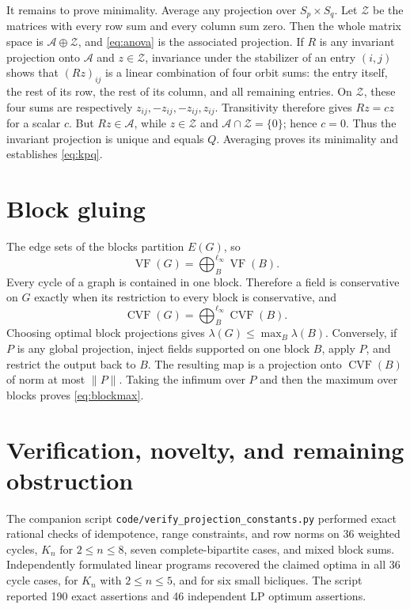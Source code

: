 \documentclass[11pt]{article}
\newcommand{\VF}{\operatorname{VF}}
\newcommand{\CVF}{\operatorname{CVF}}
\begin{document}
It remains to prove minimality.  Average any projection over
\(S_p\times S_q\).  Let
\(\mathcal Z\) be the matrices with every row sum and every column sum
zero.  Then the whole matrix space is \(\mathcal A\oplus\mathcal Z\), and
\eqref{eq:anova} is the associated projection.  If \(R\) is any invariant
projection onto \(\mathcal A\) and \(z\in\mathcal Z\), invariance under
the stabilizer of an entry \((i,j)\) shows that \((Rz)_{ij}\) is a linear
combination of four orbit sums: the entry itself, the rest of its row, the
rest of its column, and all remaining entries.  On \(\mathcal Z\), these
four sums are respectively \(z_{ij},-z_{ij},-z_{ij},z_{ij}\).  Transitivity
therefore gives \(Rz=c z\) for a scalar \(c\).  But \(Rz\in\mathcal A\),
while \(z\in\mathcal Z\) and \(\mathcal A\cap\mathcal Z=\{0\}\); hence
\(c=0\).  Thus the invariant projection is unique and equals \(Q\).
Averaging proves its minimality and establishes \eqref{eq:kpq}.

\section{Block gluing}

The edge sets of the blocks partition \(E(G)\), so
\[
 \VF(G)=\bigoplus_{B}^{\ell_\infty}\VF(B).
\]
Every cycle of a graph is contained in one block.  Therefore a field is
conservative on \(G\) exactly when its restriction to every block is
conservative, and
\[
 \CVF(G)=\bigoplus_B^{\ell_\infty}\CVF(B).
\]
Choosing optimal block projections gives
\(\lambda(G)\leq\max_B\lambda(B)\).  Conversely, if \(P\) is any global
projection, inject fields supported on one block \(B\), apply \(P\), and
restrict the output back to \(B\).  The resulting map is a projection onto
\(\CVF(B)\) of norm at most \(\|P\|\).  Taking the infimum over \(P\) and
then the maximum over blocks proves \eqref{eq:blockmax}.

\section{Verification, novelty, and remaining obstruction}

The companion script \texttt{code/verify\_projection\_constants.py}
performed exact rational checks of idempotence, range constraints, and row
norms on 36 weighted cycles, \(K_n\) for \(2\leq n\leq8\), seven
complete-bipartite cases, and mixed block sums.  Independently formulated
linear programs recovered the claimed optima in all 36 cycle cases, for
\(K_n\) with \(2\leq n\leq5\), and for six small bicliques.  The script
reported 190 exact assertions and 46 independent LP optimum assertions.
\end{document}
